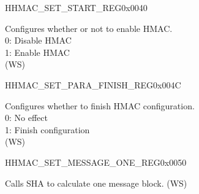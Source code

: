 \begin{register}{H}{HMAC\_SET\_START\_REG}{0x0040}\label{regdesc:HMACSETSTARTREG}
    \regnewline%
    \begin{regdesc}\begin{reglist}
    \label{fielddesc:HMACSETSTART}\item [HMAC\_SET\_START] Configures whether or not to enable HMAC.
    \\0: Disable HMAC
    \\1: Enable HMAC
    \\(WS)
    \end{reglist}\end{regdesc}
    \end{register}


    \begin{register}{H}{HMAC\_SET\_PARA\_FINISH\_REG}{0x004C}\label{regdesc:HMACSETPARAFINISHREG}
    \regnewline%
    \begin{regdesc}\begin{reglist}
    \label{fielddesc:HMACSETPARAEND}\item [HMAC\_SET\_PARA\_END] Configures whether to finish HMAC configuration.
    \\0: No effect
    \\1: Finish configuration
    \\(WS)
    \end{reglist}\end{regdesc}
    \end{register}


    \begin{register}{H}{HMAC\_SET\_MESSAGE\_ONE\_REG}{0x0050}\label{regdesc:HMACSETMESSAGEONEREG}
    \regnewline%
    \begin{regdesc}\begin{reglist}
    \label{fielddesc:HMACSETTEXTONE}\item [HMAC\_SET\_TEXT\_ONE] Calls SHA to calculate one message block. (WS)
    \end{reglist}\end{regdesc}
    \end{register}


